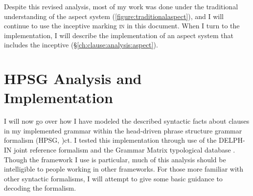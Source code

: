 \begin{comment}
\ex \label{ex:mul1}
\begingl
\glpreamble mułaa //
\gla muł-(y)aˑ //
\glb tide.comes.in-\textsc{cv} //
\glft tide starting to come up (\textbf{T}, Fidelia Haiyupis & \textsc{B}, Bob Mundy) //
\endgl
\xe

\ex \label{ex:mul2}
\begingl
\glpreamble muułšiƛ //
\gla muł-šiƛ-LS(?) //
\glb tide.comes.in-\textsc{mo}-\textsc{grad}(?) //
\glft tide coming in (\textbf{T}, Fidelia Haiyupis & \textsc{B}, Bob Mundy) //
\endgl
\xe

\ex \label{ex:mul3}
\begingl
\glpreamble mułiičiƛ //
\gla muł-a-LS //
\glb tide.comes.in-\textsc{mo}-\textsc{grad} //
\glft tide coming in (\textbf{T}, Fidelia Haiyupis & \textsc{B}, Bob Mundy) //
\endgl
\xe
\end{comment}




Despite this revised analysis, most of my work was done under the traditional understanding of the aspect system (\cref{figure:traditionalaspect}), and I will continue to use the inceptive marking \textsc{in} in this document. When I turn to the implementation, I will describe the implementation of an aspect system that includes the inceptive (\S\ref{ch:clause:analysis:aspect}).

\section{HPSG Analysis and Implementation} \label{ch:clause:analysis}

I will now go over how I have modeled the described syntactic facts about clauses in my implemented grammar within the head-driven phrase structure grammar formalism (HPSG, \citealt{pollardsag1994})ct. I tested this implementation through use of the DELPH-IN joint reference formalism \citep{copestake2002} and the Grammar Matrix typological database \citep{bender2002}. Though the framework I use is particular, much of this analysis should be intelligible to people working in other frameworks. For those more familiar with other syntactic formalisms, I will attempt to give some basic guidance to decoding the formalism.

